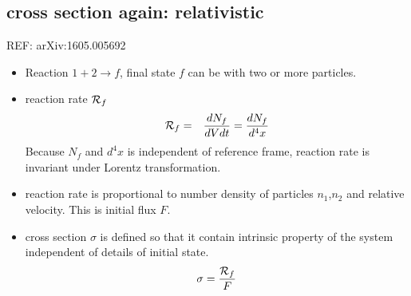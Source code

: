 \documentclass[10pt]{book}
\newcommand{\bea}{\begin{eqnarray}}
\newcommand{\eea}{\end{eqnarray}}
\begin{document}
\subsection{cross section again: relativistic}
REF: arXiv:1605.005692

\begin{itemize}
	\item Reaction $1+2\to f$, final state $f$ can be with two or more particles. 
	\item reaction rate ${\cal R}_f$
	      \bea 
	      {\cal R}_f&=&\frac{dN_f}{dV dt} =\frac{d N_f}{d^4 x}
	      \eea   
	      Because $N_f$ and $d^4x$ is independent of reference frame, reaction rate is 
	      invariant under Lorentz transformation. 
	 \item reaction rate is proportional to number density of particles $n_1$,$n_2$ and 
	       relative velocity. This is initial flux $F$. 
	 \item cross section $\sigma$ is defined so that it contain intrinsic property of the 
	       system independent of details of initial state. 
	       \bea 
	       \sigma =\frac{{\cal R}_f}{F}
	       \eea             
	       

\end{itemize}
\end{document}
